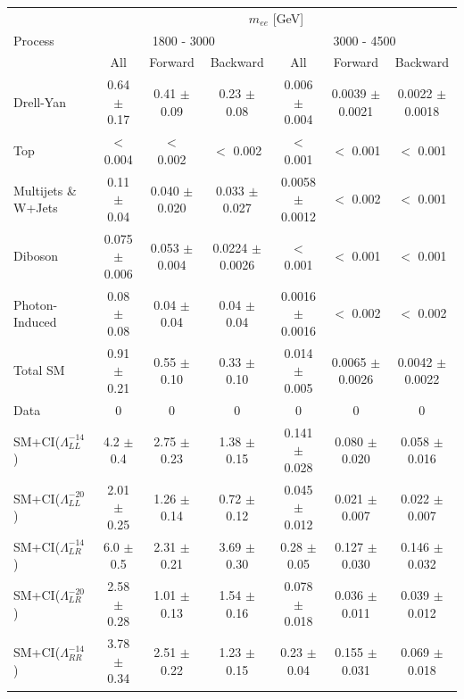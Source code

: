 	\begin {table}[h]
		\scriptsize 
		\begin{center}
		\begin{tabular}{  l | c c c | c c c  }
			\hline
			\hline
			\multirow{3}{*}{Process} 	& \multicolumn{6}{c}{$m_{ee}$ [GeV]} \\
										& \multicolumn{3}{c}{1800 - 3000} & \multicolumn{3}{c}{3000 - 4500} \\
										\cline{2-7}
										& All & Forward & Backward & All & Forward & Backward \\
			\hline
			Drell-Yan & 0.64 $\pm$ 0.17 & 0.41 $\pm$ 0.09 & 0.23 $\pm$ 0.08 & 0.006 $\pm$ 0.004 & 0.0039 $\pm$ 0.0021 & 0.0022 $\pm$ 0.0018 \\
			Top & $<$ 0.004   & $<$ 0.002   & $<$ 0.002   & $<$ 0.001   & $<$ 0.001   & $<$ 0.001   \\
			Multijets \& W+Jets & 0.11 $\pm$ 0.04 & 0.040 $\pm$ 0.020 & 0.033 $\pm$ 0.027 & 0.0058 $\pm$ 0.0012 & $<$ 0.002   & $<$ 0.001   \\
			Diboson & 0.075 $\pm$ 0.006 & 0.053 $\pm$ 0.004 & 0.0224 $\pm$ 0.0026 & $<$ 0.001   & $<$ 0.001   & $<$ 0.001   \\
			Photon-Induced & 0.08 $\pm$ 0.08 & 0.04 $\pm$ 0.04 & 0.04 $\pm$ 0.04 & 0.0016 $\pm$ 0.0016 & $<$ 0.002   & $<$ 0.002   \\
			\hline
			Total SM & 0.91 $\pm$ 0.21 & 0.55 $\pm$ 0.10 & 0.33 $\pm$ 0.10 & 0.014 $\pm$ 0.005 & 0.0065 $\pm$ 0.0026 & 0.0042 $\pm$ 0.0022 \\
			\hline
			Data & 0 & 0 & 0 & 0 & 0 & 0 \\
			\hline
			SM+CI($\Lambda^{-14}_{LL}$) & 4.2 $\pm$ 0.4 & 2.75 $\pm$ 0.23 & 1.38 $\pm$ 0.15 & 0.141 $\pm$ 0.028 & 0.080 $\pm$ 0.020 & 0.058 $\pm$ 0.016 \\
			SM+CI($\Lambda^{-20}_{LL}$) & 2.01 $\pm$ 0.25 & 1.26 $\pm$ 0.14 & 0.72 $\pm$ 0.12 & 0.045 $\pm$ 0.012 & 0.021 $\pm$ 0.007 & 0.022 $\pm$ 0.007 \\
			SM+CI($\Lambda^{-14}_{LR}$) & 6.0 $\pm$ 0.5 & 2.31 $\pm$ 0.21 & 3.69 $\pm$ 0.30 & 0.28 $\pm$ 0.05 & 0.127 $\pm$ 0.030 & 0.146 $\pm$ 0.032 \\
			SM+CI($\Lambda^{-20}_{LR}$) & 2.58 $\pm$ 0.28 & 1.01 $\pm$ 0.13 & 1.54 $\pm$ 0.16 & 0.078 $\pm$ 0.018 & 0.036 $\pm$ 0.011 & 0.039 $\pm$ 0.012 \\
			SM+CI($\Lambda^{-14}_{RR}$) & 3.78 $\pm$ 0.34 & 2.51 $\pm$ 0.22 & 1.23 $\pm$ 0.15 & 0.23 $\pm$ 0.04 & 0.155 $\pm$ 0.031 & 0.069 $\pm$ 0.018 \\

\end{tabular}
\end{center}
\end{table}
